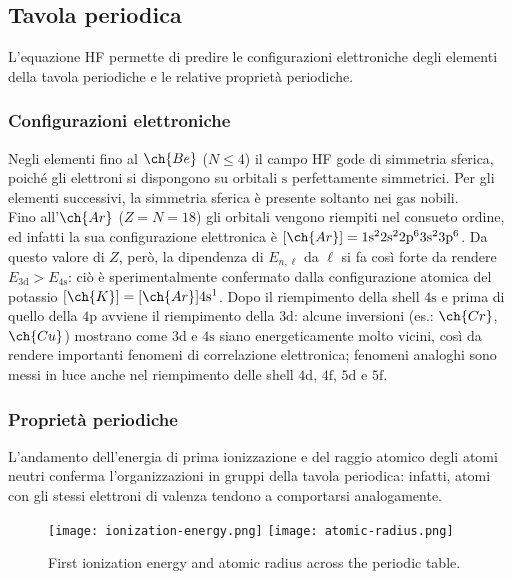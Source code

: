 \subsection{Tavola periodica}

L'equazione HF permette di predire le configurazioni elettroniche degli elementi della tavola periodiche e le relative proprietà periodiche.

\subsubsection{Configurazioni elettroniche}

Negli elementi fino al $ \ch{Be} $ ($ N \le 4 $) il campo HF gode di simmetria sferica, poiché gli elettroni si dispongono su orbitali $ \text{s} $ perfettamente simmetrici. Per gli elementi successivi, la simmetria sferica è presente soltanto nei gas nobili. \\
Fino all'$ \ch{Ar} $ ($ Z = N = 18 $) gli orbitali vengono riempiti nel consueto ordine, ed infatti la sua configurazione elettronica è $ [\ch{Ar}] = \text{1s}^2 \text{2s}^2 \text{2p}^6 \text{3s}^2 \text{3p}^6 $. Da questo valore di $ Z $, però, la dipendenza di $ E_{n,\ell} $ da $ \ell $ si fa così forte da rendere $ E_\text{3d} > E_\text{4s} $: ciò è sperimentalmente confermato dalla configurazione atomica del potassio $ [\ch{K}] = [\ch{Ar}] \text{4s}^1 $. Dopo il riempimento della shell $ \text{4s} $ e prima di quello della $ \text{4p} $ avviene il riempimento della $ \text{3d} $: alcune inversioni (es.: $ \ch{Cr} $, $ \ch{Cu} $) mostrano come $ \text{3d} $ e $ \text{4s} $ siano energeticamente molto vicini, così da rendere importanti fenomeni di correlazione elettronica; fenomeni analoghi sono messi in luce anche nel riempimento delle shell $ \text{4d} $, $ \text{4f} $, $ \text{5d} $ e $ \text{5f} $.

\subsubsection{Proprietà periodiche}

L'andamento dell'energia di prima ionizzazione e del raggio atomico degli atomi neutri conferma l'organizzazioni in gruppi della tavola periodica: infatti, atomi con gli stessi elettroni di valenza tendono a comportarsi analogamente.

\begin{figure}
	\centering
	\texttt{[image: ionization-energy.png]}
	\texttt{[image: atomic-radius.png]}
	\caption{First ionization energy and atomic radius across the periodic table.}
	\label{ion-en-atom-rad}
\end{figure}

